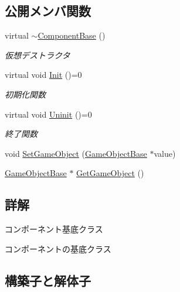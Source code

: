 \subsection*{公開メンバ関数}
\begin{DoxyCompactItemize}
\item 
virtual \mbox{\hyperlink{class_component_base_a5d22c6d5f792ff42ab6cb11a8ac38478}{$\sim$\+Component\+Base}} ()
\begin{DoxyCompactList}\small\item\em 仮想デストラクタ \end{DoxyCompactList}\item 
virtual void \mbox{\hyperlink{class_component_base_a125939d6befe42f28886a6523e86b18b}{Init}} ()=0
\begin{DoxyCompactList}\small\item\em 初期化関数 \end{DoxyCompactList}\item 
virtual void \mbox{\hyperlink{class_component_base_a9f42beaf0383d6f629819579cab4de57}{Uninit}} ()=0
\begin{DoxyCompactList}\small\item\em 終了関数 \end{DoxyCompactList}\item 
void \mbox{\hyperlink{class_component_base_ac9fc08588e3d29caf8d692a3392fc7b0}{Set\+Game\+Object}} (\mbox{\hyperlink{class_game_object_base}{Game\+Object\+Base}} $\ast$value)
\item 
\mbox{\hyperlink{class_game_object_base}{Game\+Object\+Base}} $\ast$ \mbox{\hyperlink{class_component_base_a0ac0d71aeeb768401f34a2e780b1e25d}{Get\+Game\+Object}} ()
\end{DoxyCompactItemize}


\subsection{詳解}
コンポーネント基底クラス 

コンポーネントの基底クラス 

\subsection{構築子と解体子}
\mbox{\label{class_component_base_a5d22c6d5f792ff42ab6cb11a8ac38478}} 
